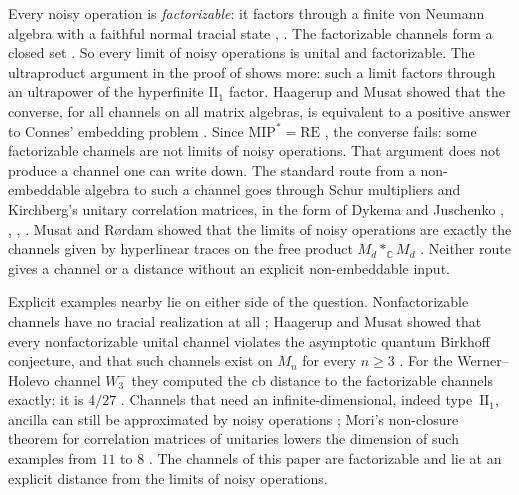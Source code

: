 \documentclass[11pt]{article}
\begin{document}
Every noisy operation is \emph{factorizable}: it factors through a finite von Neumann algebra with a faithful normal tracial state \cite[Definition~6.2]{Anantharaman06}, \cite[Theorem~2.2]{HaagerupMusat11}.  The factorizable channels form a closed set \cite[Remark~1.4(b) and proof of Theorem~6.1]{HaagerupMusat11}.  So every limit of noisy operations is unital and factorizable.  The ultraproduct argument in the proof of \cite[Theorem~3.6]{HaagerupMusat15} shows more: such a limit factors through an ultrapower of the hyperfinite $\mathrm{II}_1$ factor.  Haagerup and Musat showed that the converse, for all channels on all matrix algebras, is equivalent to a positive answer to Connes' embedding problem \cite[Theorem~3.7]{HaagerupMusat15}.  Since $\mathrm{MIP}^*=\mathrm{RE}$ \cite{JiEtAl20}, the converse fails: some factorizable channels are not limits of noisy operations.  That argument does not produce a channel one can write down.  The standard route from a non-embeddable algebra to such a channel goes through Schur multipliers and Kirchberg's unitary correlation matrices, in the form of Dykema and Juschenko \cite{Kirchberg93}, \cite{DykemaJuschenko11}, \cite[proof of Theorem~3.7]{HaagerupMusat15}, \cite[Corollary~3.11]{Musat25}.  Musat and R\o rdam showed that the limits of noisy operations are exactly the channels given by hyperlinear traces on the free product $M_d*_{\mathbb C}M_d$ \cite[Proposition~3.2(ii) and Theorem~2.10]{MusatRordam21}.  Neither route gives a channel or a distance without an explicit non-embeddable input.

Explicit examples nearby lie on either side of the question.  Nonfactorizable channels have no tracial realization at all \cite{HaagerupMusat11}; Haagerup and Musat showed that every nonfactorizable unital channel violates the asymptotic quantum Birkhoff conjecture, and that such channels exist on $M_n$ for every $n\ge3$ \cite[Theorem~6.1 and its proof]{HaagerupMusat11}.  For the Werner--Holevo channel $W_3^-$ they computed the cb distance to the factorizable channels exactly: it is $4/27$ \cite[Theorem~5.6(2)]{HaagerupMusat15}.  Channels that need an infinite-dimensional, indeed type~$\mathrm{II}_1$, ancilla can still be approximated by noisy operations \cite[Theorem~4.1]{MusatRordam20}; Mori's non-closure theorem for correlation matrices of unitaries \cite[Theorem~2.3]{Mori24} lowers the dimension of such examples from $11$ to $8$ \cite[Corollary~3.10]{Musat25}.  The channels of this paper are factorizable and lie at an explicit distance from the limits of noisy operations.
\end{document}
